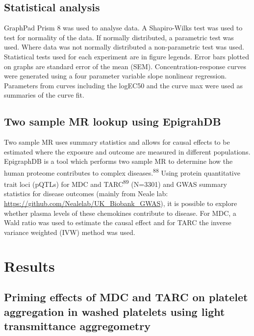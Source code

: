 \documentclass[11pt,twoside]{bristolthesis}
\begin{document}
\hypertarget{statistical-analysis-2}{%
\subsection{Statistical analysis}\label{statistical-analysis-2}}

GraphPad Prism 8 was used to analyse data. A Shapiro-Wilks test was used to test for normality of the data. If normally distributed, a parametric test was used. Where data was not normally distributed a non-parametric test was used. Statistical tests used for each experiment are in figure legends. Error bars plotted on graphs are standard error of the mean (SEM). Concentration-response curves were generated using a four parameter variable slope nonlinear regression. Parameters from curves including the logEC50 and the curve max were used as summaries of the curve fit.

\hypertarget{two-sample-mr-lookup-using-epigrahdb}{%
\subsection{Two sample MR lookup using EpigrahDB}\label{two-sample-mr-lookup-using-epigrahdb}}

Two sample MR uses summary statistics and allows for causal effects to be estimated where the exposure and outcome are measured in different populations. EpigraphDB is a tool which performs two sample MR to determine how the human proteome contributes to complex diseases.\textsuperscript{88} Using protein quantitative trait loci (pQTLs) for MDC and TARC\textsuperscript{89} (N=3301) and GWAS summary statistics for disease outcomes (mainly from Neale lab: \url{https://github.com/Nealelab/UK_Biobank_GWAS}), it is possible to explore whether plasma levels of these chemokines contribute to disease. For MDC, a Wald ratio was used to estimate the causal effect and for TARC the inverse variance weighted (IVW) method was used.

\hypertarget{results-2}{%
\section{Results}\label{results-2}}

\hypertarget{priming-effects-of-mdc-and-tarc-on-platelet-aggregation-in-washed-platelets-using-light-transmittance-aggregometry}{%
\subsection{Priming effects of MDC and TARC on platelet aggregation in washed platelets using light transmittance aggregometry}\label{priming-effects-of-mdc-and-tarc-on-platelet-aggregation-in-washed-platelets-using-light-transmittance-aggregometry}}
\end{document}
